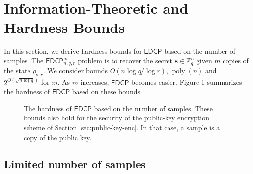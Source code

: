 \documentclass[11pt]{article}
\theoremstyle{plain}
\theoremstyle{definition}
\DeclareMathOperator{\poly}{poly}
\def\Z{\mathbb{Z}}
\def\lwe{\mathsf{LWE}}
\def\edcp{\mathsf{EDCP}}
\begin{document}
\section{Information-Theoretic and Hardness Bounds}
\label{sec:hardness}

In this section, we derive hardness bounds for $\edcp$ based on the number of samples. The $\edcp_{n, q, r}^m$ problem is to recover the secret $\bm{s} \in \Z_q^n$ given $m$ copies of the state $\rho_{\bm{s}, r}$. We consider bounds $O( n\log q / \log r)$, $\poly(n)$ and $2^{O(\sqrt{n \log q})}$ for $m$. As $m$ increases, $\edcp$ becomes easier. Figure \ref{fig:hardness-bounds} summarizes the hardness of $\edcp$ based on these bounds.  

\begin{figure}
    \centering
    \caption{The hardness of $\edcp$ based on the number of samples. These bounds also hold for the security of the public-key encryption scheme of Section \ref{sec:public-key-enc}. In that case, a sample is a copy of the public key.}
    \label{fig:hardness-bounds}
\end{figure}





\subsection{Limited number of samples}
\label{sec:hardness-limited}
\end{document}
